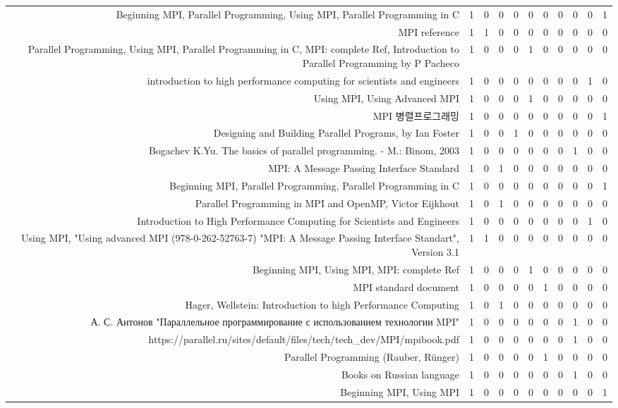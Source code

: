 {\begin{landscape}
\begin{longtable}[htb]{r|c|c|c|c|c|c|c|c|c|c}
{Beginning MPI, Parallel Programming, Using MPI, Parallel Programming in C} & 1 & 0 & 0 & 0 & 0 & 0 & 0 & 0 & 0 & 1 \\%
{MPI reference} & 1 & 1 & 0 & 0 & 0 & 0 & 0 & 0 & 0 & 0 \\%
{Parallel Programming, Using MPI, Parallel Programming in C, MPI: complete Ref, Introduction to Parallel Programming by P Pacheco} & 1 & 0 & 0 & 0 & 1 & 0 & 0 & 0 & 0 & 0 \\%
{introduction to high performance computing for scientists and engineers} & 1 & 0 & 0 & 0 & 0 & 0 & 0 & 0 & 1 & 0 \\%
{Using MPI, Using Advanced MPI} & 1 & 0 & 0 & 0 & 1 & 0 & 0 & 0 & 0 & 0 \\%
{MPI 병렬프로그래밍} & 1 & 0 & 0 & 0 & 0 & 0 & 0 & 0 & 0 & 1 \\%
{Designing and Building Parallel Programs, by Ian Foster} & 1 & 0 & 0 & 1 & 0 & 0 & 0 & 0 & 0 & 0 \\%
{Bogachev K.Yu. The basics of parallel programming. - M.: Binom, 2003} & 1 & 0 & 0 & 0 & 0 & 0 & 0 & 1 & 0 & 0 \\%
{MPI: A Message Passing Interface Standard} & 1 & 0 & 1 & 0 & 0 & 0 & 0 & 0 & 0 & 0 \\%
{Beginning MPI, Parallel Programming, Parallel Programming in C} & 1 & 0 & 0 & 0 & 0 & 0 & 0 & 0 & 0 & 1 \\%
{Parallel Programming in MPI and OpenMP, Victor Eijkhout} & 1 & 0 & 1 & 0 & 0 & 0 & 0 & 0 & 0 & 0 \\%
{Introduction to High Performance Computing for Scientists and Engineers} & 1 & 0 & 0 & 0 & 0 & 0 & 0 & 0 & 1 & 0 \\%
{Using MPI, "Using advanced MPI (978-0-262-52763-7)  "MPI: A Message Passing Interface Standart", Version 3.1} & 1 & 1 & 0 & 0 & 0 & 0 & 0 & 0 & 0 & 0 \\%
{Beginning MPI, Using MPI, MPI: complete Ref} & 1 & 0 & 0 & 0 & 1 & 0 & 0 & 0 & 0 & 0 \\%
{MPI standard document} & 1 & 0 & 0 & 0 & 0 & 1 & 0 & 0 & 0 & 0 \\%
{Hager, Wellstein: Introduction to high Performance Computing} & 1 & 0 & 1 & 0 & 0 & 0 & 0 & 0 & 0 & 0 \\%
{А. С. Антонов "Параллельное программирование с использованием технологии MPI"} & 1 & 0 & 0 & 0 & 0 & 0 & 0 & 1 & 0 & 0 \\%
{https://parallel.ru/sites/default/files/tech/tech\_dev/MPI/mpibook.pdf} & 1 & 0 & 0 & 0 & 0 & 0 & 0 & 1 & 0 & 0 \\%
{Parallel Programming (Rauber, Rünger)} & 1 & 0 & 0 & 0 & 0 & 1 & 0 & 0 & 0 & 0 \\%
{Books on Russian language} & 1 & 0 & 0 & 0 & 0 & 0 & 0 & 1 & 0 & 0 \\%
{Beginning MPI, Using MPI} & 1 & 0 & 0 & 0 & 0 & 0 & 0 & 0 & 0 & 1 \\%
\hline%
\end{longtable}%
\end{landscape}}%
\clearpage%
